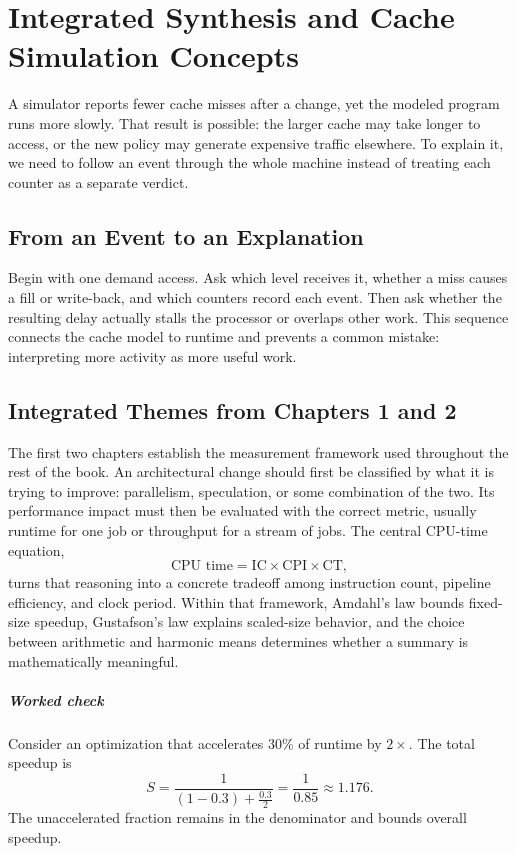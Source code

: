 \chapter{Integrated Synthesis and Cache Simulation Concepts}\label{ch:auto-006}

A simulator reports fewer cache misses after a change, yet the modeled program runs more slowly.
That result is possible: the larger cache may take longer to access, or the new policy may generate expensive traffic elsewhere.
To explain it, we need to follow an event through the whole machine instead of treating each counter as a separate verdict.


\section{From an Event to an Explanation}\label{sec:auto-046}
Begin with one demand access.
Ask which level receives it, whether a miss causes a fill or write-back, and which counters record each event.
Then ask whether the resulting delay actually stalls the processor or overlaps other work.
This sequence connects the cache model to runtime and prevents a common mistake: interpreting more activity as more useful work.


\section{Integrated Themes from Chapters 1 and 2}\label{sec:auto-047}
The first two chapters establish the measurement framework used throughout the rest of the book.
An architectural change should first be classified by what it is trying to improve: parallelism, speculation, or some combination of the two.
Its performance impact must then be evaluated with the correct metric, usually runtime for one job or throughput for a stream of jobs.
The central CPU-time equation,
\[
    \text{CPU time}=\text{IC}\times\text{CPI}\times\text{CT},
\]
turns that reasoning into a concrete tradeoff among instruction count, pipeline efficiency, and clock period.
Within that framework, Amdahl's law bounds fixed-size speedup, Gustafson's law explains scaled-size behavior, and the choice between arithmetic and harmonic means determines whether a summary is mathematically meaningful.

\paragraph{Worked check}\label{par:auto-026}
Consider an optimization that accelerates 30\% of runtime by $2\times$.
The total speedup is
\begin{equation}\label{eq:auto-045}
    S=\frac{1}{(1-0.3)+\frac{0.3}{2}}=\frac{1}{0.85}\approx 1.176.
\end{equation}
The unaccelerated fraction remains in the denominator and bounds overall speedup.

